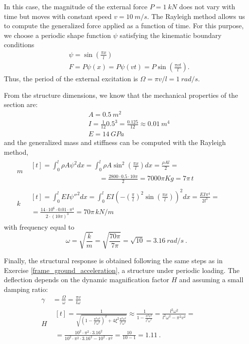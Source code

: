\begin{Answer}[ref={moving_load}]
In this case, the magnitude of the external force $P=\SI{1}{kN}$ does not vary with time but moves with constant speed $v=\SI{10}{m/s}$. The Rayleigh method allows us to compute the generalized force applied as a function of time. For this purpose, we choose a periodic shape function $\psi$ satisfying the kinematic boundary conditions
\begin{align*}
&\psi = \sin\left(\frac{\pi x}{l}\right) \\
&F = P\psi(x) = P\psi(vt) = P\sin\left(\frac{\pi vt}{l}\right).
\end{align*}
Thus, the period of the external excitation is $\Omega = \pi v/l = \SI{1}{rad/s}$.

From the structure dimensions, we know that the mechanical properties of the section are:
\begin{align*}
&A = \SI{0.5}{m^2} \\
&I = \frac{1}{12}0.5^3 = \frac{0.125}{12} \approx \SI{0.01}{m^4}\\
&E = \SI{14}{GPa}
\end{align*}
and the generalized mass and stiffness can be computed with the Rayleigh method,
\begin{align*}
m& \begin{multlined}[t]= \int_0^l \rho A\psi^2dx = \int_0^l \rho A\sin^2\left(\frac{\pi x}{l}\right)dx = \frac{\rho Al}{2} = \\
\phantom{\hspace{10em}}= \frac{2800 \cdot 0.5 \cdot 10\pi}{2} = 7000\pi Kg = 7\pi \,\si{t}\end{multlined} \\
k& \begin{multlined}[t]= \int_0^l EI\psi''^2dx = \int_0^l EI\left(-\left(\frac{\pi}{l}\right)^2\sin\left(\frac{\pi x}{l}\right)\right)^2dx = \frac{EI\pi^4}{2l^3} = \qquad \\
= \frac{14\cdot 10^6 \cdot 0.01 \cdot \pi^4}{2 \cdot (10\pi)^3} =
70\pi \,\si{kN/m} \end{multlined}
\end{align*}
with frequency equal to
$$
\omega = \sqrt{\frac{k}{m}} = \sqrt{\frac{70\pi}{7\pi}} = \sqrt{10} = \SI{3.16}{rad/s}\ .
$$

Finally, the structural response is obtained following the same steps as in Exercise \ref{frame_ground_acceleration}, a structure under periodic loading. The deflection depends on the dynamic magnification factor $H$ and assuming a small damping ratio:
\begin{align*}
\gamma& = \frac{\Omega}{\omega} = \frac{\pi v}{l\omega} \\
H& \begin{multlined}[t]= \frac{1}{\sqrt{\left(1-\frac{\pi^2v^2}{l^2\omega^2}\right)^2 + 4\xi^2\frac{\pi^2v^2}{l^2\omega^2}}} \approx \frac{1}{1-\frac{\pi^2v^2}{l^2\omega^2}} = \frac{l^2\omega^2}{l^2\omega^2-\pi^2v^2} = \qquad \\
= \frac{10^2\cdot\pi^2\cdot 3.16^2}{10^2\cdot\pi^2\cdot 3.16^2 - 10^2\cdot\pi^2}
= \frac{10}{10-1} = 1.11\ . \end{multlined}
\end{align*}


\end{Answer}
